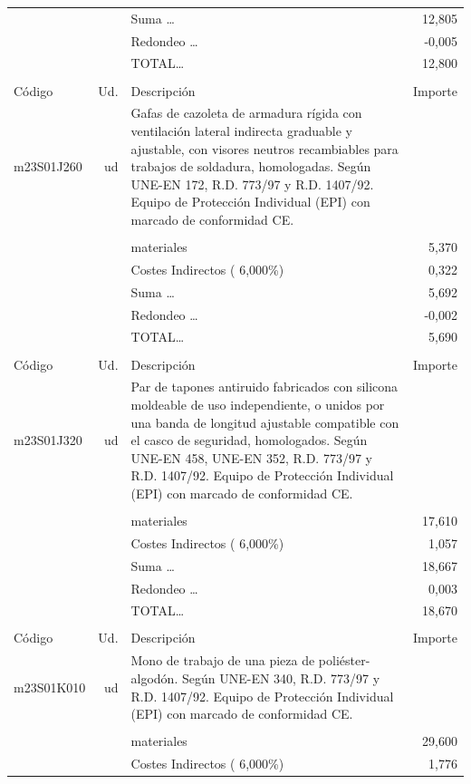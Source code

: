 \documentclass{book}%
\begin{document}
\begin{supertabular}{l r p{60mm} r}
&&Suma \ldots&    12,805\\%
&&Redondeo \ldots&    {-}0,005\\%
%
&&TOTAL\ldots&    12,800\\%
&&&\\%
Código&Ud.&Descripción&Importe\\%
\hline%
m23S01J260&ud&Gafas de cazoleta de armadura rígida con ventilación lateral indirecta graduable y ajustable, con visores neutros recambiables para trabajos de soldadura, homologadas. Según UNE{-}EN 172, R.D. 773/97 y R.D. 1407/92. Equipo de Protección Individual (EPI) con marcado de conformidad CE.&\\%
&&&\\%
&&materiales&     5,370\\%
&&Costes Indirectos (     6,000\%)&     0,322\\%
&&Suma \ldots&     5,692\\%
&&Redondeo \ldots&    {-}0,002\\%
%
&&TOTAL\ldots&     5,690\\%
&&&\\%
Código&Ud.&Descripción&Importe\\%
\hline%
m23S01J320&ud&Par de tapones antiruido fabricados con silicona moldeable de uso independiente, o unidos por una banda de longitud ajustable compatible con el casco de seguridad, homologados. Según UNE{-}EN 458, UNE{-}EN 352, R.D. 773/97 y R.D. 1407/92. Equipo de Protección Individual (EPI) con marcado de conformidad CE.&\\%
&&&\\%
&&materiales&    17,610\\%
&&Costes Indirectos (     6,000\%)&     1,057\\%
&&Suma \ldots&    18,667\\%
&&Redondeo \ldots&     0,003\\%
%
&&TOTAL\ldots&    18,670\\%
&&&\\%
Código&Ud.&Descripción&Importe\\%
\hline%
m23S01K010&ud&Mono de trabajo de una pieza de poliéster{-}algodón. Según UNE{-}EN 340, R.D. 773/97 y R.D. 1407/92. Equipo de Protección Individual (EPI) con marcado de conformidad CE.&\\%
&&&\\%
&&materiales&    29,600\\%
&&Costes Indirectos (     6,000\%)&     1,776\\%

\end{supertabular}
\end{document}
